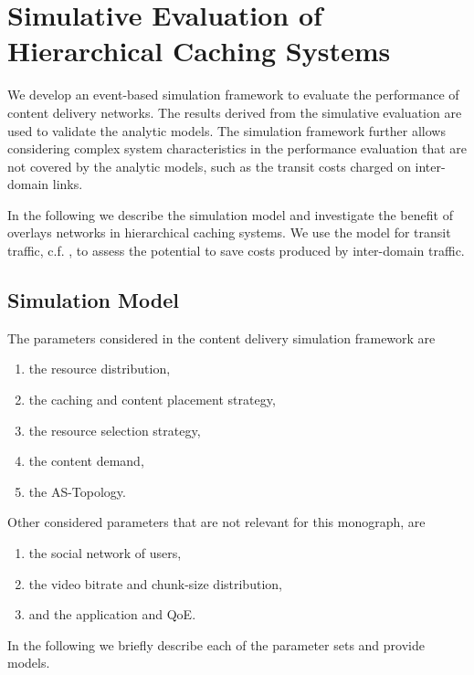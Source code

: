 \section{Simulative Evaluation of Hierarchical Caching Systems}\label{sec:hierarchical:simulative:simulative}

We develop an event-based simulation framework to evaluate the performance of content delivery networks.
The results derived from the simulative evaluation are used to validate the analytic models.
The simulation framework further allows considering complex system characteristics in the performance evaluation that are not covered by the analytic models, such as the transit costs charged on inter-domain links.

In the following we describe the simulation model and investigate the benefit of overlays networks in hierarchical caching systems.
We use the model for transit traffic, c.f. , to assess the potential to save costs produced by inter-domain traffic.

\subsection{Simulation Model}\label{sec:simeval}

The parameters considered in the content delivery simulation framework are
\begin{enumerate}
  \itemsep0em
  \item the resource distribution,
  \item the caching and content placement strategy,
  \item the resource selection strategy,
  \item the content demand,
  \item the AS-Topology.
\end{enumerate}
Other considered parameters that are not relevant for this monograph, are
\begin{enumerate}
  \itemsep0em
  \item the social network of users,
  \item the video bitrate and chunk-size distribution,
  \item and the application and QoE.
\end{enumerate}
In the following we briefly describe each of the parameter sets and provide models.

